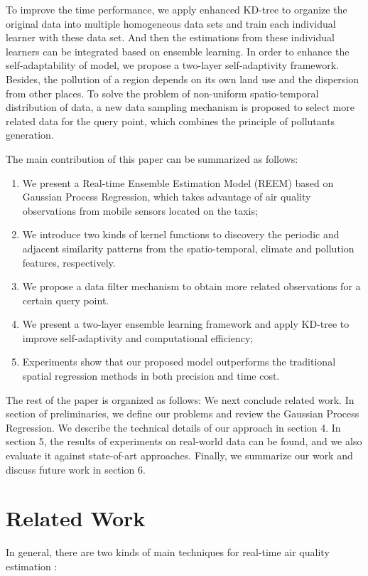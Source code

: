 \documentclass[twoside,leqno,twocolumn]{article}
\begin{document}
To improve the time performance, we apply enhanced KD-tree to organize the original data into multiple homogeneous data sets and train each individual learner with these data set. And then the estimations from these individual learners can be integrated based on ensemble learning. In order to enhance the self-adaptability of model, we propose a two-layer self-adaptivity framework. Besides, the pollution of a region depends on its own land use and the dispersion from other places. To solve the problem of non-uniform spatio-temporal distribution of data, a new data sampling mechanism is proposed to select more related data for the query point, which combines the principle of pollutants generation.

The main contribution of this paper can be summarized as follows:
\begin{enumerate}
 \item We present a Real-time Ensemble Estimation Model (REEM) based on Gaussian Process Regression, which takes advantage of air quality observations from mobile sensors located on the taxis;
 \item We introduce two kinds of kernel functions to discovery the periodic and adjacent similarity patterns from the spatio-temporal, climate and pollution features, respectively.
 \item We propose a data filter mechanism to obtain more related observations for a certain query point.
 \item We present a two-layer ensemble learning framework and apply KD-tree to improve self-adaptivity and computational efficiency;
 \item Experiments show that our proposed model outperforms the traditional spatial regression methods in both precision and time cost.
\end{enumerate}
The rest of the paper is organized as follows: We next conclude related work. In section of preliminaries, we define our problems and review the Gaussian Process Regression. We describe the technical details of our approach in section 4. In section 5, the results of experiments on real-world data can be found, and we also evaluate it against state-of-art approaches. Finally, we summarize our work and discuss future work in section 6.

\section{Related Work}
In general, there are two kinds of main techniques for real-time air quality estimation \cite{Waylang}:
\end{document}
